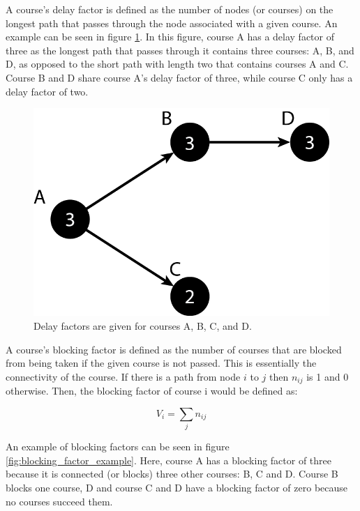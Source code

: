 \documentclass[botnum, fleqn]{unmeethesis}
\begin{document}
    A course's delay factor is defined as the number of nodes (or courses) on the longest path that passes through the node associated with a given course. An example can be seen in figure \ref{fig:delay_factor_example}. In this figure, course A has a delay factor of three as the longest path that passes through it contains three courses: A, B, and D, as opposed to the short path with length two that contains courses A and C. Course B and D share course A's delay factor of three, while course C only has a delay factor of two.

    \begin{figure}[h!]
      \centerline{\includegraphics[scale=0.4]{./figures/delay_factor.png}}
      \caption{Delay factors are given for courses A, B, C, and D.} 
      \label{fig:delay_factor_example}
    \end{figure}

    A course's blocking factor is defined as the number of courses that are blocked from being taken if the given course is not passed. This is essentially the connectivity of the course. If there is a path from node \(i\) to \(j\) then \(n_{ij}\) is 1 and 0 otherwise. Then, the blocking factor of course i would be defined as:

    \begin{equation}
      V_{i} = \sum_{j} n_{ij}
    \end{equation}

    An example of blocking factors can be seen in figure \ref{fig:blocking_factor_example}. Here, course A has a blocking factor of three because it is connected (or blocks) three other courses: B, C and D. Course B blocks one course, D and course C and D have a blocking factor of zero because no courses succeed them.
\end{document}
